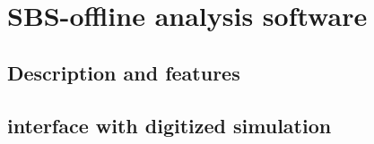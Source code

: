 \section{SBS-offline analysis software}

\subsection{Description and features}

\subsection{interface with digitized simulation}

